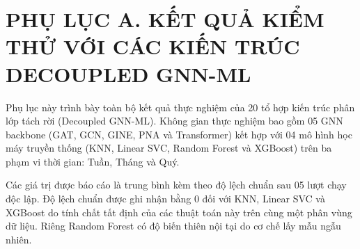 \chapter{PHỤ LỤC A. KẾT QUẢ KIỂM THỬ VỚI CÁC KIẾN TRÚC DECOUPLED GNN-ML}

\indent\indent Phụ lục này trình bày toàn bộ kết quả thực nghiệm của 20 tổ hợp kiến trúc phân lớp tách rời (Decoupled GNN-ML). Không gian thực nghiệm bao gồm 05 GNN backbone (GAT, GCN, GINE, PNA và Transformer) kết hợp với 04 mô hình học máy truyền thống (KNN, Linear SVC, Random Forest và XGBoost) trên ba phạm vi thời gian: Tuần, Tháng và Quý.\vspace{.3cm}

Các giá trị được báo cáo là trung bình kèm theo độ lệch chuẩn sau 05 lượt chạy độc lập. Độ lệch chuẩn được ghi nhận bằng $0$ đối với KNN, Linear SVC và XGBoost do tính chất tất định của các thuật toán này trên cùng một phân vùng dữ liệu. Riêng Random Forest có độ biến thiên nội tại do cơ chế lấy mẫu ngẫu nhiên.

